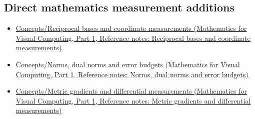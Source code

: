 \subsection{Direct mathematics measurement additions}\label{appendix-a6d556a4ef50-direct-mathematics-measurement-additions}

\hypertarget{appendix-a6d556a4ef50-direct-mathematics-measurement-additions}{}

\begin{itemize}
\tightlist
\item
  \href{../02-Mathematics-for-Visual-Computing-P01/main.pdf\#appendix-6b3d696dd902}{Concepts/Reciprocal bases and coordinate measurements (Mathematics for Visual Computing, Part 1, Reference notes: Reciprocal bases and coordinate measurements)}
\item
  \href{../02-Mathematics-for-Visual-Computing-P01/main.pdf\#appendix-d6d9dbbe3c14}{Concepts/Norms, dual norms and error budgets (Mathematics for Visual Computing, Part 1, Reference notes: Norms, dual norms and error budgets)}
\item
  \href{../02-Mathematics-for-Visual-Computing-P01/main.pdf\#appendix-f4acdb1d5563}{Concepts/Metric gradients and differential measurements (Mathematics for Visual Computing, Part 1, Reference notes: Metric gradients and differential measurements)}
\end{itemize}
